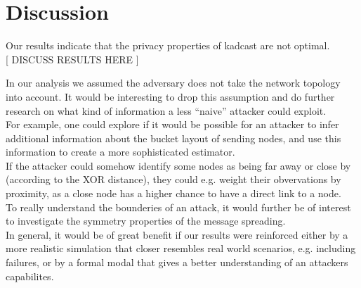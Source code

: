 \section{Discussion}
Our results indicate that the privacy properties of kadcast are not optimal. \\



[ DISCUSS RESULTS HERE ]



In our analysis we assumed the adversary does not take the network topology into account.
It would be interesting to drop this assumption and do further research on what kind of
information a less ``naive'' attacker could exploit. \\
For example, one could explore if it would be possible for an attacker to infer additional information
about the bucket layout of sending nodes, and use this information to create a more sophisticated estimator. \\
If the attacker could somehow identify some nodes as being far away or close by (according to the XOR distance),
they could e.g. weight their obvervations by proximity, as a close node has a higher chance to have a direct link
to a node. \\

To really understand the bounderies of an attack, it would further be of interest to
investigate the symmetry properties of the message spreading. \\
In general, it would be of great benefit if our results were reinforced either
by a more realistic simulation that closer resembles real world scenarios, e.g. including failures, or
by a formal modal that gives a better understanding of an attackers capabilites.




